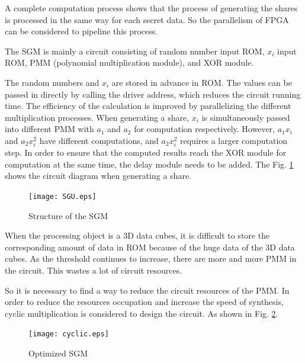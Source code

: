 A complete computation process shows that the process of generating the shares is processed in the same way for each secret data. So the parallelism of FPGA can be considered to pipeline this process.

The SGM is mainly a circuit consisting of random number input ROM, $x_{i}$ input ROM, PMM (polynomial multiplication module), and XOR module.

The random numbers and $x_{i}$ are stored in advance in ROM. The values can be passed in directly by calling the driver address, which reduces the circuit running time. The efficiency of the calculation is improved by parallelizing the different multiplication processes. {\color{red}When generating a share, $x_{i}$ is simultaneously passed into different PMM with $a_{1}$ and $a_{2}$ for computation respectively. However, $a_{1}x_{i}$ and $a_{2}x_{i}^{2}$ have different computations, and $a_{2}x_{i}^{2}$ requires a larger computation step. In order to ensure that the computed results reach the XOR module for computation at the same time, the delay module needs to be added.} The Fig. \ref{fig05} shows the circuit diagram when generating a share.

\begin{figure}[!htb]
	\begin{center}
		\texttt{[image: SGU.eps]}\\
		\caption{Structure of the SGM}
		\label{fig05}
		\vspace{-2.0em}
	\end{center}
\end{figure}

When the processing object is a 3D data cubes, it is difficult to store the corresponding amount of data in ROM because of the huge data of the 3D data cubes. As the threshold continues to increase, there are more and more PMM in the circuit. This wastes a lot of circuit resources.

So it is necessary to find a way to reduce the circuit resources of the PMM. In order to reduce the resources occupation and increase the speed of synthesis, cyclic multiplication is considered to design the circuit. As shown in Fig. \ref{fig06}.

\begin{figure}[!htb]
	\begin{center}
 		\texttt{[image: cyclic.eps]}\\
		\caption{Optimized SGM}
		\label{fig06}
		\vspace{-2.0em}
	\end{center}
\end{figure}

